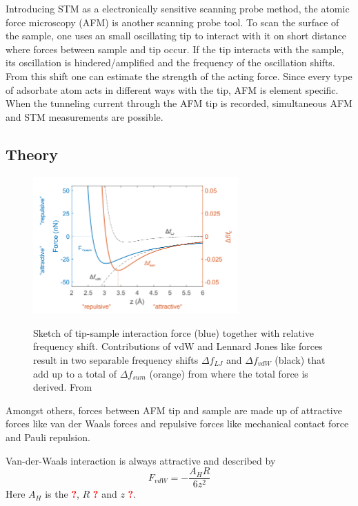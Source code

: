 Introducing STM as a electronically sensitive scanning probe method, the atomic force microscopy (AFM) is another scanning probe tool. To scan the surface of the sample, one uses an small oscillating tip to interact with it on short distance where forces between sample and tip occur. If the tip interacts with the sample, its oscillation is hindered/amplified and the frequency of the oscillation shifts. 
From this shift one can estimate the strength of the acting force. Since every type of adsorbate atom acts in different ways with the tip, AFM is element specific. When the tunneling current through the AFM tip is recorded, simultaneous AFM and STM measurements are possible. 
\subsection{Theory}

\begin{figure}\centering
	\includegraphics[width=0.7\textwidth]{./images/AFM-graph-martin}
		\label{fig:AFM-force}
\caption{Sketch of tip-sample interaction force (blue) together with relative frequency shift. Contributions of vdW and Lennard Jones like forces result in two separable frequency shifts $\Delta f_{LJ}$ and $\Delta f_{vdW}$ (black) that add up to a total of $\Delta f_{sum}$ (orange) from where the total force is derived. From \cite{schwarz_assembly_2018}}
\label{fig:AFM-sketch}%
\end{figure}

Amongst others, forces between AFM tip and sample are made up of attractive forces like van der Waals forces and repulsive forces like mechanical contact force and Pauli repulsion.

Van-der-Waals interaction is always attractive and described by
\begin{equation} \label{eq:vdW}
F_{vdW} = - \frac{A_H R}{6z^2}
\end{equation}
Here $A_H$ is the \textcolor{red}{\textbf{?}}, $R$ \textcolor{red}{\textbf{?}} and $z$ \textcolor{red}{\textbf{?}}.

